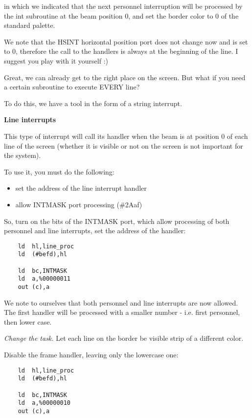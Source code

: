 \documentclass{article}
\begin{document}
in which we indicated that the next personnel interruption will be
processed by the int subroutine at the beam position 0, and set the
border color to 0 of the standard palette.

We note that the HSINT horizontal position port does not change now
and is set to 0, therefore the call to the handlers is always at the
beginning of the line. I suggest you play with it yourself :)

Great, we can already get to the right place on the screen. But what
if you need a certain subroutine to execute EVERY line?

To do this, we have a tool in the form of a string interrupt.

\textbf{Line interrupts}

This type of interrupt will call its handler when the beam is at
position 0 of each line of the screen (whether it is visible or not on
the screen is not important for the system).

To use it, you must do the following:

\begin{itemize}
\item set the address of the line interrupt handler
\item allow INTMASK port processing (\#2Aaf)
\end{itemize}

So, turn on the bits of the INTMASK port, which allow processing of
both personnel and line interrupts, set the address of the handler:

\begin{verbatim}
    ld	hl,line_proc
    ld	(#befd),hl

    ld	bc,INTMASK
    ld	a,%00000011
    out	(c),a
\end{verbatim}

We note to ourselves that both personnel and line interrupts are now
allowed. The first handler will be processed with a smaller number -
i.e. first personnel, then lower case.

\emph{Change the task. }Let each line on the border be visible strip
of a different color.

Disable the frame handler, leaving only the lowercase one:

\begin{verbatim}
    ld	hl,line_proc
    ld	(#befd),hl

    ld	bc,INTMASK
    ld	a,%00000010
    out	(c),a
\end{verbatim}
\end{document}
